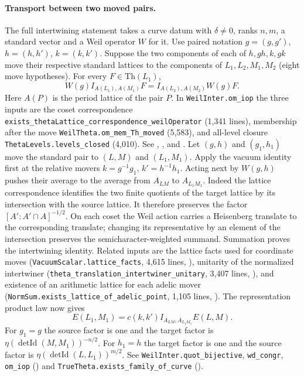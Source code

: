 \paragraph{Transport between two moved pairs.}\label{r14:eq-transport}
The full intertwining statement takes a curve datum with $\delta\ne0$,
ranks $n,m$, a standard vector and a Weil operator $W$ for it.
Use paired notation $g=(g,g')$, $h=(h,h')$, $k=(k,k')$.
Suppose the two components of each of $h,gh,k,gk$ move their respective
standard lattices to the components of $L_1,L_2,M_1,M_2$ (eight move
hypotheses). For every $F\in\mathrm{Th}(L_1)$,
\[
 W(g) I_{A(L_1),A(M_1)}F
   = I_{A(L_2),A(M_2)} W(g)F.
\]
Here $A(P)$ is the period lattice of the pair $P$. In
\nolinkurl{WeilInter.om_iop} the three inputs are the coset correspondence
\nolinkurl{exists_thetaLattice_correspondence_weilOperator} (1,341 lines),
membership after the move \nolinkurl{WeilTheta.om_mem_Th_moved} (5,583),
and all-level closure \nolinkurl{ThetaLevels.levels_closed} (4,010).
See ,
,
 and
.
Let $(g,h)$ and $(g_1,h_1)$ move the standard pair to $(L,M)$ and
$(L_1,M_1)$. Apply the vacuum identity first at the relative movers
$k=g^{-1}g_1$, $k'=h^{-1}h_1$. Acting next by $W(g,h)$ pushes their
average to the average from $A_{LM}$ to $A_{L_1M_1}$. Indeed the lattice
correspondence identifies the two finite quotients of the target lattice
by its intersection with the source lattice. It therefore preserves the
factor $[A':A'\cap A]^{-1/2}$. On each coset the Weil action carries a
Heisenberg translate to the corresponding translate; changing its
representative by an element of the intersection preserves the
semicharacter-weighted summand. Summation proves the intertwining identity.
Related inputs are the lattice facts used for coordinate moves
(\nolinkurl{VacuumScalar.lattice_facts}, 4,615 lines,
), unitarity of the normalized
intertwiner (\nolinkurl{theta_translation_intertwiner_unitary},
3,407 lines, ),
and existence of an arithmetic lattice for each adelic mover
(\nolinkurl{NormSum.exists_lattice_of_adelic_point}, 1,105 lines,
).
The representation product law now gives
\[
 E(L_1,M_1)=c(k,k')I_{A_{LM},A_{L_1M_1}}E(L,M).
\]
For $g_1=g$ the source factor is one and the target factor is
$\eta(\operatorname{detId}(M,M_1))^{-n/2}$. For $h_1=h$ the target factor is one
and the source factor is $\eta(\operatorname{detId}(L,L_1))^{m/2}$.
See \nolinkurl{WeilInter.quot_bijective}, \nolinkurl{wd_congr},
\nolinkurl{om_iop} ()
and \nolinkurl{TrueTheta.exists_family_of_curve}
().

